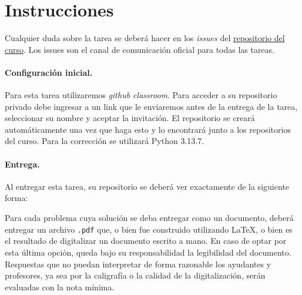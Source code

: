 
\section*{Instrucciones}

Cualquier duda sobre la tarea se deberá hacer en los \emph{issues} del \href{https://github.com/IIC3253/2026}{repositorio del curso}. Los issues son el canal de comunicación oficial para todas las tareas.

\paragraph{Configuración inicial.} 
Para esta tarea utilizaremos \textit{github classroom}. 
Para acceder a su repositorio privado debe ingresar a un link que le enviaremos antes de la entrega de la tarea, seleccionar su nombre y aceptar la invitación.
El repositorio se creará automáticamente una vez que haga esto y lo encontrará junto a los repositorios del curso.
Para la corrección se utilizará Python 3.13.7.

\paragraph{Entrega.} Al entregar esta tarea, su repositorio se deberá ver exactamente de la siguiente forma:

\bigskip


\bigskip

Para cada problema cuya solución se deba entregar como un documento, deberá entregar un archivo \texttt{.pdf} que, o bien fue construido utilizando \LaTeX, o bien es el resultado de digitalizar un documento escrito a mano. En caso de optar por esta última opción, queda bajo su responsabilidad la legibilidad del documento. Respuestas que no puedan interpretar de forma razonable los ayudantes y profesores, ya sea por la caligrafía o la calidad de la digitalización, serán evaluadas con la nota mínima.
